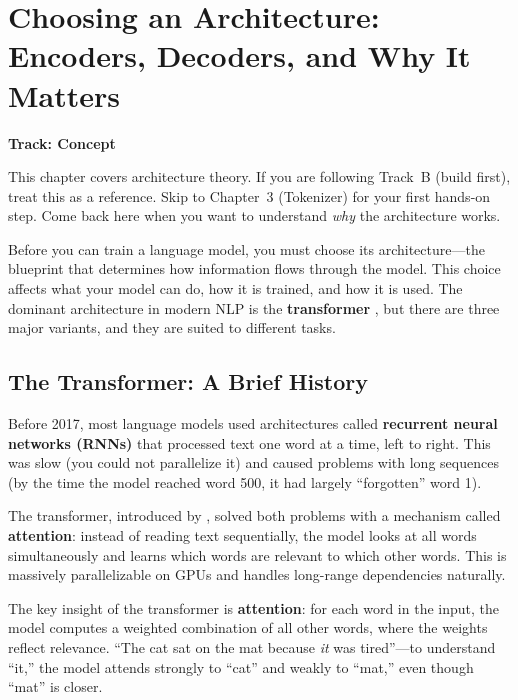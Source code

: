 \documentclass[11pt,a4paper]{article}
\begin{document}

\section{Choosing an Architecture: Encoders, Decoders, and Why It Matters}
\label{ch:architecture}

\begin{center}
\colorbox{lightaccent}{\textbf{Track: Concept}}
\end{center}

\begin{tip}[title={For Build-First Readers}]
This chapter covers architecture theory. If you are following Track~B (build first), treat this as a reference. Skip to Chapter~3 (Tokenizer) for your first hands-on step. Come back here when you want to understand \emph{why} the architecture works.
\end{tip}

Before you can train a language model, you must choose its architecture---the blueprint that determines how information flows through the model. This choice affects what your model can do, how it is trained, and how it is used. The dominant architecture in modern NLP is the \textbf{transformer} \citep{vaswani2017attention}, but there are three major variants, and they are suited to different tasks.

\subsection{The Transformer: A Brief History}

Before 2017, most language models used architectures called \textbf{recurrent neural networks (RNNs)} that processed text one word at a time, left to right. This was slow (you could not parallelize it) and caused problems with long sequences (by the time the model reached word 500, it had largely ``forgotten'' word 1).

The transformer, introduced by \citet{vaswani2017attention}, solved both problems with a mechanism called \textbf{attention}: instead of reading text sequentially, the model looks at all words simultaneously and learns which words are relevant to which other words. This is massively parallelizable on GPUs and handles long-range dependencies naturally.

\begin{keyidea}
The key insight of the transformer is \textbf{attention}: for each word in the input, the model computes a weighted combination of all other words, where the weights reflect relevance. ``The cat sat on the mat because \emph{it} was tired''---to understand ``it,'' the model attends strongly to ``cat'' and weakly to ``mat,'' even though ``mat'' is closer.
\end{keyidea}
\end{document}
